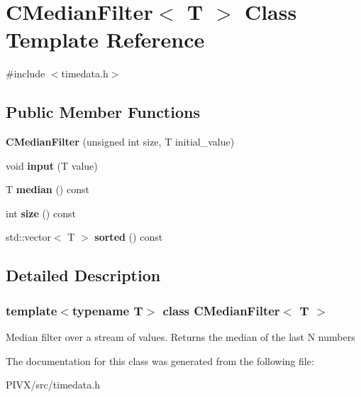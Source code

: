 \hypertarget{class_c_median_filter}{}\section{C\+Median\+Filter$<$ T $>$ Class Template Reference}
\label{class_c_median_filter}


{\ttfamily \#include $<$timedata.\+h$>$}

\subsection*{Public Member Functions}
\begin{DoxyCompactItemize}
\item 
\mbox{\label{class_c_median_filter_a181463ed081ece10fd437875243d9cad}} 
{\bfseries C\+Median\+Filter} (unsigned int size, T initial\+\_\+value)
\item 
\mbox{\label{class_c_median_filter_ae10cde98866b034ec73c530be4c60874}} 
void {\bfseries input} (T value)
\item 
\mbox{\label{class_c_median_filter_ade078740cdd0555adc2e52468d090c42}} 
T {\bfseries median} () const
\item 
\mbox{\label{class_c_median_filter_a618073c8aa8504670182d40d7084501c}} 
int {\bfseries size} () const
\item 
\mbox{\label{class_c_median_filter_a2ec3e6107c12dc2564f0323d39ecca1e}} 
std\+::vector$<$ T $>$ {\bfseries sorted} () const
\end{DoxyCompactItemize}


\subsection{Detailed Description}
\subsubsection*{template$<$typename T$>$\newline
class C\+Median\+Filter$<$ T $>$}

Median filter over a stream of values. Returns the median of the last N numbers 

The documentation for this class was generated from the following file\+:\begin{DoxyCompactItemize}
\item 
P\+I\+V\+X/src/timedata.\+h\end{DoxyCompactItemize}
